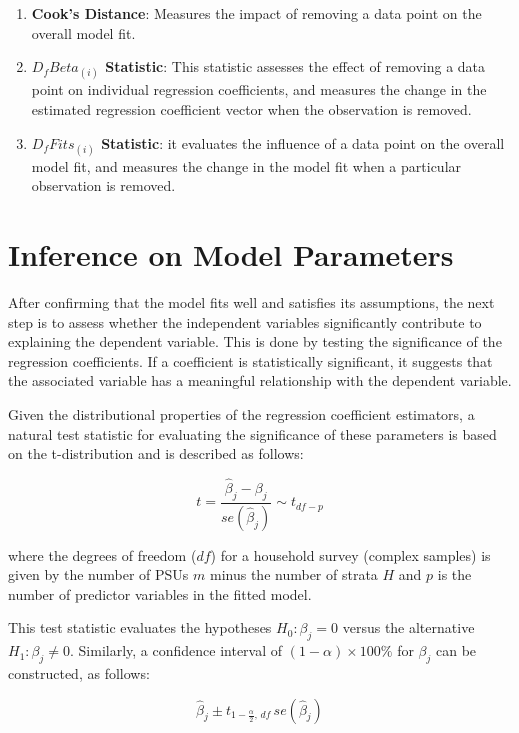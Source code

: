 \documentclass[
  12pt,
]{book}
\begin{document}
\begin{enumerate}
\def\labelenumi{\arabic{enumi}.}
\item
  \textbf{Cook's Distance}: Measures the impact of removing a data point on the overall model fit.
\item
  \textbf{\(D_fBeta_{(i)}\) Statistic}: This statistic assesses the effect of removing a data point on individual regression coefficients, and measures the change in the estimated regression coefficient vector when the observation is removed.
\item
  \textbf{\(D_{f}Fits_{\left(i\right)}\) Statistic}: it evaluates the influence of a data point on the overall model fit, and measures the change in the model fit when a particular observation is removed.
\end{enumerate}

\hypertarget{inference-on-model-parameters}{%
\section{Inference on Model Parameters}\label{inference-on-model-parameters}}

After confirming that the model fits well and satisfies its assumptions, the next step is to assess whether the independent variables significantly contribute to explaining the dependent variable. This is done by testing the significance of the regression coefficients. If a coefficient is statistically significant, it suggests that the associated variable has a meaningful relationship with the dependent variable.

Given the distributional properties of the regression coefficient estimators, a natural test statistic for evaluating the significance of these parameters is based on the t-distribution and is described as follows:

\[
t = \frac{\widehat{\beta}_{j}-\beta_{j}}{se\left(\widehat{\beta}_{j}\right)}\sim t_{df - p}
\]

where the degrees of freedom (\(df\)) for a household survey (complex samples) is given by the number of PSUs \(m\) minus the number of strata \(H\) and \(p\) is the number of predictor variables in the fitted model.

This test statistic evaluates the hypotheses \(H_{0}:\beta_{j}=0\) versus the alternative \(H_{1}:\beta_{j}\neq0\). Similarly, a confidence interval of \((1-\alpha)\times100\%\) for \(\beta_{j}\) can be constructed, as follows:

\[
\widehat{\beta}_{j}\pm t_{1-\frac{\alpha}{2},\,df}\,se\left(\widehat{\beta}_{j}\right)
\]
\end{document}
